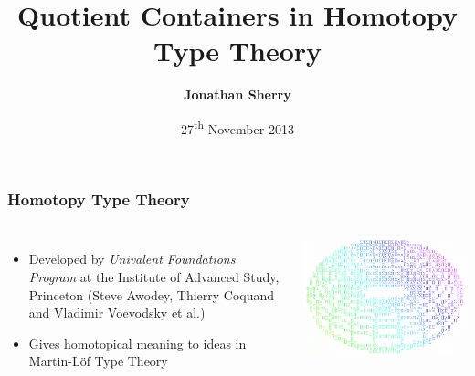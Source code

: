 \documentclass{beamer}
\title[Quotient Containers in Homotopy Type Theory]{Quotient Containers in Homotopy Type Theory} %
\author{\textbf{Jonathan Sherry}} %
\institute[University of Nottingham] %
{
\small{Supervisor: Thorsten Altenkirch}\\
University of Nottingham  %
}
\date{27\textsuperscript{th} November  2013 } %
\begin{document}
\begin{frame}
\titlepage
\end{frame}



\begin{frame}
\frametitle{Homotopy Type Theory}
\begin{columns}[c]

\begin{itemize}
\item \scriptsize{Developed by \textit{Univalent Foundations Program} at the Institute of Advanced Study, Princeton (Steve Awodey, Thierry Coquand and Vladimir Voevodsky et al.)}
\item \scriptsize{Gives homotopical meaning to ideas in Martin-L\"of Type Theory}
\end{itemize}

\begin{flushleft}
\includegraphics[scale=0.23]{1.png}
\end{flushleft}


\end{columns}

\end{frame}

\end{document}
